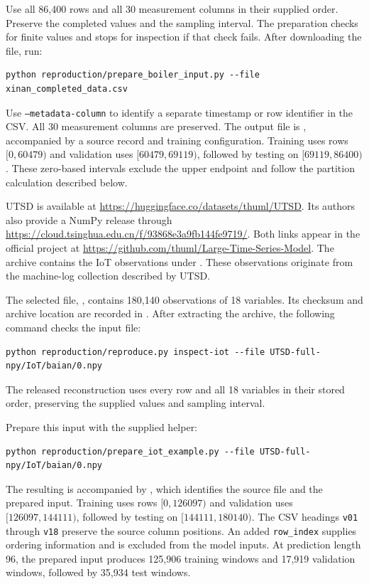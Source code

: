 Use all 86,400 rows and all 30 measurement columns in their supplied order. Preserve the completed values and the sampling interval. The preparation checks for finite values and stops for inspection if that check fails. After downloading the file, run:
\begin{lstlisting}
python reproduction/prepare_boiler_input.py --file xinan_completed_data.csv
\end{lstlisting}
Use \texttt{--metadata-column} to identify a separate timestamp or row identifier in the CSV. All 30 measurement columns are preserved. The output file is , accompanied by a source record and training configuration. Training uses rows $[0,60479)$ and validation uses $[60479,69119)$, followed by testing on $[69119,86400)$. These zero-based intervals exclude the upper endpoint and follow the partition calculation described below.

UTSD is available at \url{https://huggingface.co/datasets/thuml/UTSD}. Its authors also provide a NumPy release through \url{https://cloud.tsinghua.edu.cn/f/93868e3a9fb144fe9719/}. Both links appear in the official project at \url{https://github.com/thuml/Large-Time-Series-Model}. The archive  contains the IoT observations under . These observations originate from the machine-log collection described by UTSD.

The selected file, , contains 180,140 observations of 18 variables. Its checksum and archive location are recorded in . After extracting the archive, the following command checks the input file:
\begin{lstlisting}
python reproduction/reproduce.py inspect-iot --file UTSD-full-npy/IoT/baian/0.npy
\end{lstlisting}
The released reconstruction uses every row and all 18 variables in their stored order, preserving the supplied values and sampling interval.

Prepare this input with the supplied helper:
\begin{lstlisting}
python reproduction/prepare_iot_example.py --file UTSD-full-npy/IoT/baian/0.npy
\end{lstlisting}
The resulting  is accompanied by , which identifies the source file and the prepared input. Training uses rows $[0,126097)$ and validation uses $[126097,144111)$, followed by testing on $[144111,180140)$. The CSV headings \texttt{v01} through \texttt{v18} preserve the source column positions. An added \texttt{row\_index} supplies ordering information and is excluded from the model inputs. At prediction length 96, the prepared input produces 125,906 training windows and 17,919 validation windows, followed by 35,934 test windows.

